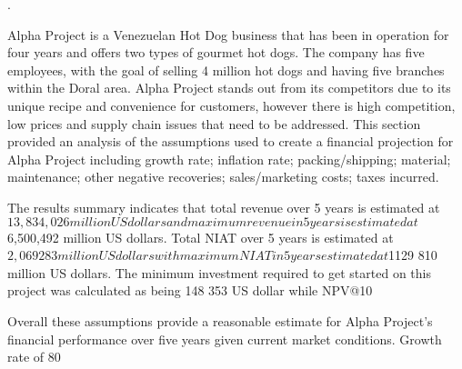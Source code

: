 .

Alpha Project is a Venezuelan Hot Dog business that has been in operation for four years and offers two types of gourmet hot dogs. The company has five employees, with the goal of selling 4 million hot dogs and having five branches within the Doral area. Alpha Project stands out from its competitors due to its unique recipe and convenience for customers, however there is high competition, low prices and supply chain issues that need to be addressed. This section provided an analysis of the assumptions used to create a financial projection for Alpha Project including growth rate; inflation rate; packing/shipping; material; maintenance; other negative recoveries; sales/marketing costs; taxes incurred. 

The results summary indicates that total revenue over 5 years is estimated at $13,834,026 million US dollars and maximum revenue in 5 years is estimated at $6,500,492 million US dollars. Total NIAT over 5 years is estimated at $2,069283 million US dollars with maximum NIAT in 5 years estimated at $1129 810 million US dollars. The minimum investment required to get started on this project was calculated as being 148 353 US dollar while NPV@10%

Overall these assumptions provide a reasonable estimate for Alpha Project's financial performance over five years given current market conditions. Growth rate of 80%